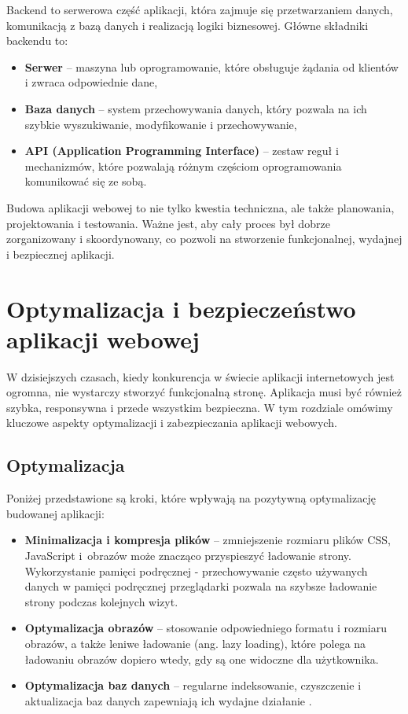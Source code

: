 Backend to serwerowa część aplikacji, która zajmuje się przetwarzaniem danych, komunikacją z bazą danych i realizacją logiki biznesowej. Główne składniki backendu to:

\begin{itemize}
\item \textbf{Serwer} -- maszyna lub oprogramowanie, które obsługuje żądania od klientów i zwraca odpowiednie dane,
\item \textbf{Baza danych} -- system przechowywania danych, który pozwala na ich szybkie wyszukiwanie, modyfikowanie i przechowywanie,
\item \textbf{API (Application Programming Interface)} -- zestaw reguł i mechanizmów, które pozwalają różnym częściom oprogramowania komunikować się ze sobą.
\end{itemize}


Budowa aplikacji webowej to nie tylko kwestia techniczna, ale także planowania, projektowania i testowania. Ważne jest, aby cały proces był dobrze zorganizowany i skoordynowany, co pozwoli na stworzenie funkcjonalnej, wydajnej i bezpiecznej aplikacji.

\section{Optymalizacja i bezpieczeństwo aplikacji webowej}

W dzisiejszych czasach, kiedy konkurencja w świecie aplikacji internetowych jest ogromna, nie wystarczy stworzyć funkcjonalną stronę. Aplikacja musi być również szybka, responsywna i przede wszystkim bezpieczna. W tym rozdziale omówimy kluczowe aspekty optymalizacji i zabezpieczania aplikacji webowych.

\subsection{Optymalizacja}
Poniżej przedstawione są kroki, które wpływają na pozytywną optymalizację budowanej aplikacji:
\begin{itemize}
\item \textbf{Minimalizacja i kompresja plików} -- zmniejszenie rozmiaru plików CSS, JavaScript i~obrazów może znacząco przyspieszyć ładowanie strony.
Wykorzystanie pamięci podręcznej - przechowywanie często używanych danych w pamięci podręcznej przeglądarki pozwala na szybsze ładowanie strony podczas kolejnych wizyt.
\item \textbf{Optymalizacja obrazów} -- stosowanie odpowiedniego formatu i rozmiaru obrazów, a także leniwe ładowanie (ang. lazy loading), które polega na ładowaniu obrazów dopiero wtedy, gdy są one widoczne dla użytkownika.
\item \textbf{Optymalizacja baz danych} -- regularne indeksowanie, czyszczenie i aktualizacja baz danych zapewniają ich wydajne działanie \cite{optymalizacja}.
\end{itemize}

